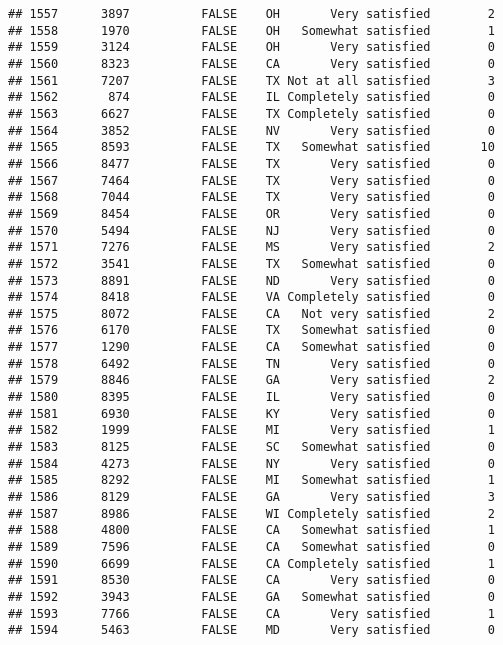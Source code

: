 \documentclass[]{book}
\theoremstyle{definition}
\theoremstyle{definition}
\theoremstyle{remark}
\begin{document}
\begin{verbatim}
## 1557      3897          FALSE    OH       Very satisfied        2
## 1558      1970          FALSE    OH   Somewhat satisfied        1
## 1559      3124          FALSE    OH       Very satisfied        0
## 1560      8323          FALSE    CA       Very satisfied        0
## 1561      7207          FALSE    TX Not at all satisfied        3
## 1562       874          FALSE    IL Completely satisfied        0
## 1563      6627          FALSE    TX Completely satisfied        0
## 1564      3852          FALSE    NV       Very satisfied        0
## 1565      8593          FALSE    TX   Somewhat satisfied       10
## 1566      8477          FALSE    TX       Very satisfied        0
## 1567      7464          FALSE    TX       Very satisfied        0
## 1568      7044          FALSE    TX       Very satisfied        0
## 1569      8454          FALSE    OR       Very satisfied        0
## 1570      5494          FALSE    NJ       Very satisfied        0
## 1571      7276          FALSE    MS       Very satisfied        2
## 1572      3541          FALSE    TX   Somewhat satisfied        0
## 1573      8891          FALSE    ND       Very satisfied        0
## 1574      8418          FALSE    VA Completely satisfied        0
## 1575      8072          FALSE    CA   Not very satisfied        2
## 1576      6170          FALSE    TX   Somewhat satisfied        0
## 1577      1290          FALSE    CA   Somewhat satisfied        0
## 1578      6492          FALSE    TN       Very satisfied        0
## 1579      8846          FALSE    GA       Very satisfied        2
## 1580      8395          FALSE    IL       Very satisfied        0
## 1581      6930          FALSE    KY       Very satisfied        0
## 1582      1999          FALSE    MI       Very satisfied        1
## 1583      8125          FALSE    SC   Somewhat satisfied        0
## 1584      4273          FALSE    NY       Very satisfied        0
## 1585      8292          FALSE    MI   Somewhat satisfied        1
## 1586      8129          FALSE    GA       Very satisfied        3
## 1587      8986          FALSE    WI Completely satisfied        2
## 1588      4800          FALSE    CA   Somewhat satisfied        1
## 1589      7596          FALSE    CA   Somewhat satisfied        0
## 1590      6699          FALSE    CA Completely satisfied        1
## 1591      8530          FALSE    CA       Very satisfied        0
## 1592      3943          FALSE    GA   Somewhat satisfied        0
## 1593      7766          FALSE    CA       Very satisfied        1
## 1594      5463          FALSE    MD       Very satisfied        0

\end{verbatim}
\end{document}
